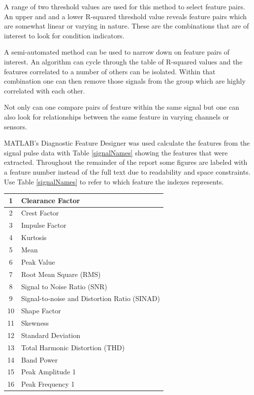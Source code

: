 \documentclass{article}
\begin{document}
A range of two threshold values are used for this method to select feature pairs. An upper and and a lower R-squared threshold value reveals feature pairs which are somewhat linear or varying in nature. These are the combinations that are of interest to look for condition indicators.

A semi-automated method can be used to narrow down on feature pairs of interest. An algorithm can cycle through the table of R-squared values and the features correlated to a number of others can be isolated. Within that combination one can then remove those signals from the group which are highly correlated with each other.

Not only can one compare pairs of feature within the same signal but one can also look for relationships between the same feature in varying channels or sensors. 

MATLAB's Diagnostic Feature Designer was used calculate the features from the signal pulse data with Table \ref{signalNames} showing the features that were extracted. Throughout the remainder of the report some figures are labeled with a feature number instead of the full text due to readability and space constraints. Use Table \ref{signalNames} to refer to which feature the indexes represents.
\begin{center}
\begin{tabular}{ |c|l| }
 \hline
 1 & Clearance Factor \\
 \hline
 2 & Crest Factor \\
 \hline
 3 & Impulse Factor \\
 \hline
 4 & Kurtosis \\
 \hline
 5 & Mean \\
 \hline
 6 & Peak Value \\
 \hline
 7 & Root Mean Square (RMS) \\ 
 \hline              
 8 & Signal to Noise Ratio (SNR) \\
 \hline
 9 & Signal-to-noise and Distortion Ratio (SINAD) \\
 \hline
 10 & Shape Factor \\
 \hline
 11 & Skewness \\
 \hline
 12 & Standard Deviation \\
 \hline
 13 & Total Harmonic Distortion (THD) \\
 \hline
 14 & Band Power \\
 \hline
 15 & Peak Amplitude 1 \\
 \hline
 16 & Peak Frequency 1 \\
 \hline
\end{tabular}
 \label{featureNames}
\end{center}
\end{document}

